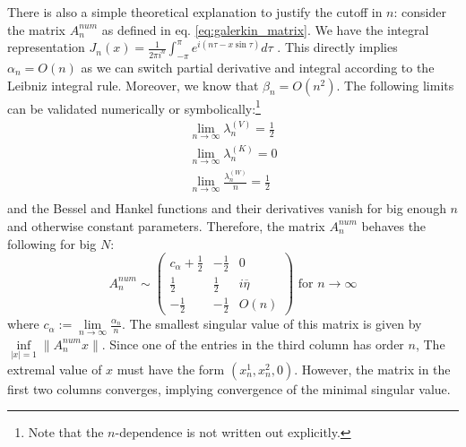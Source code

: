 \documentclass[12pt,journal,compsoc, onecolumn]{IEEEtran}
\begin{document}
\noindent
There is also a simple theoretical explanation to justify the cutoff in $n$: consider the matrix $A^{num}_n$ as defined in eq. \ref{eq:galerkin_matrix}. We have the integral representation $J_{n}(x)=\frac{1}{2 \pi i^{n}} \int_{-\pi}^{\pi} e^{i(n \tau-x \sin \tau)} d \tau$ \cite{temme1996special}. 
This directly implies $\alpha_n = O(n)$ as we can switch partial derivative and integral according to the Leibniz integral rule.
Moreover, we know that $\beta_n = O(n^2)$. The following limits can be validated numerically or symbolically:\footnote{Note that the $n$-dependence is not written out explicitly.}
\begin{align}
    \lim\limits_{n \rightarrow \infty} \lambda_n^{(V)} = \frac{1}{2} \nonumber \\
    \lim\limits_{n \rightarrow \infty} \lambda_n^{(K)} = 0 \nonumber \\
    \lim\limits_{n \rightarrow \infty} \frac{\lambda_n^{(W)}}{n} = \frac{1}{2} \nonumber \\
\end{align} and the Bessel and Hankel functions and their derivatives vanish for big enough $n$ and otherwise constant parameters. Therefore, the matrix $A^{num}_n$ behaves the following for big $N$:
$$
    A^{num}_n {\sim} 
    \begin{pmatrix}
        c_\alpha + \frac{1}{2} & - \frac{1}{2} & 0 \\
        \frac{1}{2} & \frac{1}{2} & i \overline{\eta} \\
        - \frac{1}{2} & -\frac{1}{2} & O(n)
    \end{pmatrix} \text { for } n \rightarrow \infty 
$$
where $c_\alpha := \lim\limits_{n\rightarrow \infty} \frac{\alpha_n}{n}$. The smallest singular value of this matrix is given by $\inf\limits_{|x| = 1} \|A^{num}_n x\| $. Since one of the entries in the third column has order $n$, The extremal value of $x$ must have the form $(x^1_n, x^2_n, 0)$. However, the matrix in the first two columns converges, implying convergence of the minimal singular value.
\end{document}
